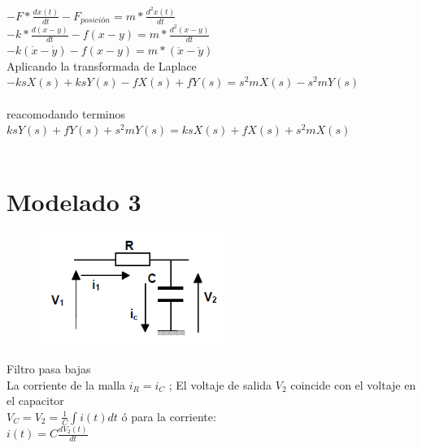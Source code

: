 \documentclass[
	12pt, %
]{fphw}
\begin{document}
$-F * \frac{d x(t)}{dt} - F_{posición} = m * \frac{d^2 x(t)}{dt}$ \\

$-k * \frac{d (x-y)}{dt} - f(x-y) = m * \frac{d^2 (x-y)}{dt}$ \\

$-k(\dot{x}-\dot{y})-f(x-y) = m*(\ddot{x}-\ddot{y})$ \\

Aplicando la transformada de Laplace \\

$-ksX(s)+ksY(s)-fX(s)+fY(s)=s^{2}mX(s)-s^{2}mY(s)$ \\ \\

reacomodando terminos \\
$ksY(s)+fY(s)+s^{2}mY(s) = ksX(s)+fX(s)+s^{2}mX(s)$ \\ \\


\newpage
\section*{{\color{Apricot}Modelado 3}}

\begin{figure}[H]
  \centering
  \includegraphics[scale=0.6]{images/p3.png}
\end{figure}

Filtro pasa bajas \\

La corriente de la malla $i_{R} = i_{C}$ ; El voltaje de salida $V_{2}$ coincide con el voltaje en el capacitor \\

$V_{C} = V_{2} = \frac{1}{C} \int i(t) dt$ ó para la corriente: \\

$i(t) = C \frac{d V_{2}(t)}{dt}$ \\
\end{document}
